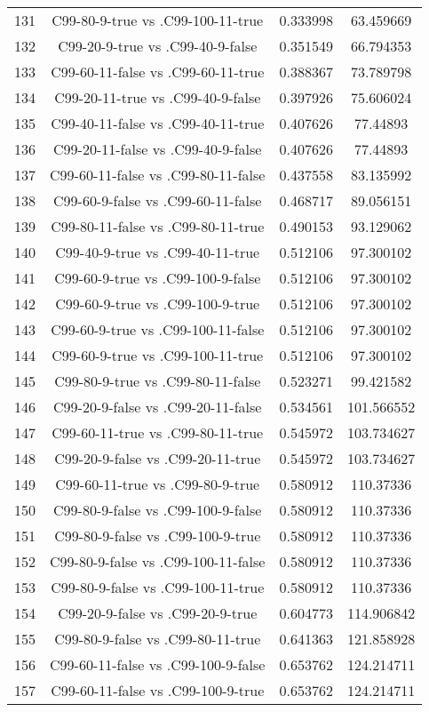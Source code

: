 \documentclass[a4paper,10pt]{article}
\begin{document}
\begin{landscape}
\begin{table}[!htp]
\begin{tabular}{cccc}
131&C99-80-9-true vs .C99-100-11-true&0.333998&63.459669\\
132&C99-20-9-true vs .C99-40-9-false&0.351549&66.794353\\
133&C99-60-11-false vs .C99-60-11-true&0.388367&73.789798\\
134&C99-20-11-true vs .C99-40-9-false&0.397926&75.606024\\
135&C99-40-11-false vs .C99-40-11-true&0.407626&77.44893\\
136&C99-20-11-false vs .C99-40-9-false&0.407626&77.44893\\
137&C99-60-11-false vs .C99-80-11-false&0.437558&83.135992\\
138&C99-60-9-false vs .C99-60-11-false&0.468717&89.056151\\
139&C99-80-11-false vs .C99-80-11-true&0.490153&93.129062\\
140&C99-40-9-true vs .C99-40-11-true&0.512106&97.300102\\
141&C99-60-9-true vs .C99-100-9-false&0.512106&97.300102\\
142&C99-60-9-true vs .C99-100-9-true&0.512106&97.300102\\
143&C99-60-9-true vs .C99-100-11-false&0.512106&97.300102\\
144&C99-60-9-true vs .C99-100-11-true&0.512106&97.300102\\
145&C99-80-9-true vs .C99-80-11-false&0.523271&99.421582\\
146&C99-20-9-false vs .C99-20-11-false&0.534561&101.566552\\
147&C99-60-11-true vs .C99-80-11-true&0.545972&103.734627\\
148&C99-20-9-false vs .C99-20-11-true&0.545972&103.734627\\
149&C99-60-11-true vs .C99-80-9-true&0.580912&110.37336\\
150&C99-80-9-false vs .C99-100-9-false&0.580912&110.37336\\
151&C99-80-9-false vs .C99-100-9-true&0.580912&110.37336\\
152&C99-80-9-false vs .C99-100-11-false&0.580912&110.37336\\
153&C99-80-9-false vs .C99-100-11-true&0.580912&110.37336\\
154&C99-20-9-false vs .C99-20-9-true&0.604773&114.906842\\
155&C99-80-9-false vs .C99-80-11-true&0.641363&121.858928\\
156&C99-60-11-false vs .C99-100-9-false&0.653762&124.214711\\
157&C99-60-11-false vs .C99-100-9-true&0.653762&124.214711\\

\end{tabular}
\end{table}
\end{landscape}
\end{document}
